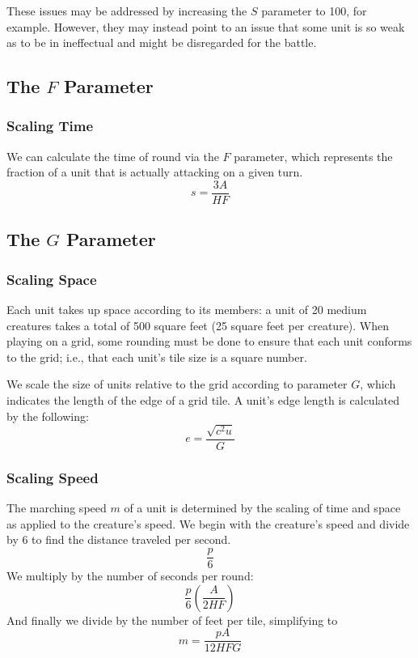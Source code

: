These issues may be addressed by increasing the $S$ parameter to 100,
for example.
However, they may instead point to an issue that some unit
is so weak as to be in ineffectual and might be disregarded for the battle.

\subsection{The $F$ Parameter}

\subsubsection{Scaling Time}
We can calculate the time of round via the $F$ parameter,
which represents the fraction of a unit that is actually attacking on a given turn.
\[
    s = \frac
        {3 A}
        {H F}
\]

\subsection{The $G$ Parameter}

\subsubsection{Scaling Space}

Each unit takes up space according to its members:
a unit of 20 medium creatures takes a total of 500 square feet (25 square feet per creature).
When playing on a grid,
some rounding must be done to ensure that each unit conforms to the grid;
i.e., that each unit's tile size is a square number.

We scale the size of units relative to the grid
according to parameter $G$,
which indicates the length of the edge of a grid tile.
A unit's edge length is calculated by the following:
\[
    e = \frac
        {\sqrt{c^2 u}}
        {G}
\]

\subsubsection{Scaling Speed}
The marching speed $m$ of a unit is determined
by the scaling of time and space
as applied to the creature's speed.
We begin with the creature's speed and divide by 6
to find the distance traveled per second.
\[
    \frac
        {p}
        {6}
\]
We multiply by the number of seconds per round:
\[
    \frac
        {p}
        {6}
    \left(
        \frac
            {A}
            {2 H F}
    \right)
\]
And finally we divide by the number of feet per tile,
simplifying to
\[
    m = \frac
        {p A}
        {12 H F G}
\]

